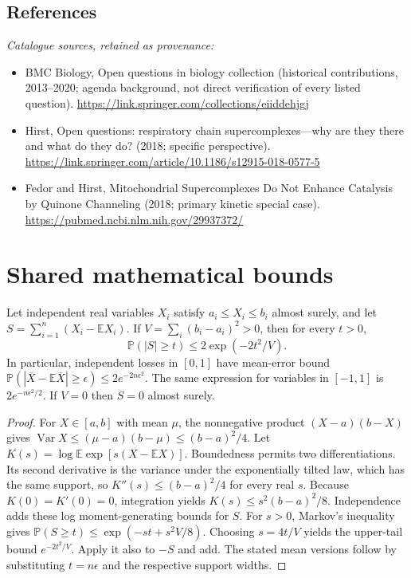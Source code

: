 \documentclass[11pt]{article}
\begin{document}
\subsection{References}
\noindent\emph{Catalogue sources, retained as provenance:}
\begin{itemize}
\item BMC Biology, Open questions in biology collection (historical contributions, 2013--2020; agenda background, not direct verification of every listed question). \url{https://link.springer.com/collections/eiiddehjgj}
\item Hirst, Open questions: respiratory chain supercomplexes---why are they there and what do they do? (2018; specific perspective). \url{https://link.springer.com/article/10.1186/s12915-018-0577-5}
\item Fedor and Hirst, Mitochondrial Supercomplexes Do Not Enhance Catalysis by Quinone Channeling (2018; primary kinetic special case). \url{https://pubmed.ncbi.nlm.nih.gov/29937372/}
\end{itemize}




\section{Shared mathematical bounds}\label{app:bounds}
\begin{lemma}\label{lem:bounded}
Let independent real variables $X_i$ satisfy $a_i\leq X_i\leq b_i$ almost surely,
and let $S=\sum_{i=1}^n(X_i-\mathbb{E} X_i)$. If
$V=\sum_i(b_i-a_i)^2>0$, then for every $t>0$,
\[
 \mathbb{P}(|S|\geq t)\leq 2\exp(-2t^2/V).
\]
In particular, independent losses in $[0,1]$ have mean-error bound
$\mathbb{P}(|\overline X-\mathbb{E}\overline X|\geq\epsilon)
\leq2e^{-2n\epsilon^2}$. The same expression for variables in $[-1,1]$
is $2e^{-n\epsilon^2/2}$. If $V=0$ then $S=0$ almost surely.
\end{lemma}
\begin{proof}
For $X\in[a,b]$ with mean $\mu$, the nonnegative product
$(X-a)(b-X)$ gives
$\operatorname{Var} X\leq(\mu-a)(b-\mu)\leq(b-a)^2/4$.
Let $K(s)=\log\mathbb{E}\exp[s(X-\mathbb{E} X)]$.
Boundedness permits two differentiations. Its second derivative is the variance
under the exponentially tilted law, which has the same support, so
$K''(s)\leq(b-a)^2/4$ for every real $s$.
Because $K(0)=K'(0)=0$, integration yields
$K(s)\leq s^2(b-a)^2/8$.
Independence adds these log moment-generating bounds for $S$.
For $s>0$, Markov's inequality gives
$\mathbb{P}(S\geq t)\leq\exp(-st+s^2V/8)$.
Choosing $s=4t/V$ yields the upper-tail bound $e^{-2t^2/V}$.
Apply it also to $-S$ and add. The stated mean versions follow by substituting
$t=n\epsilon$ and the respective support widths.
\end{proof}
\end{document}
